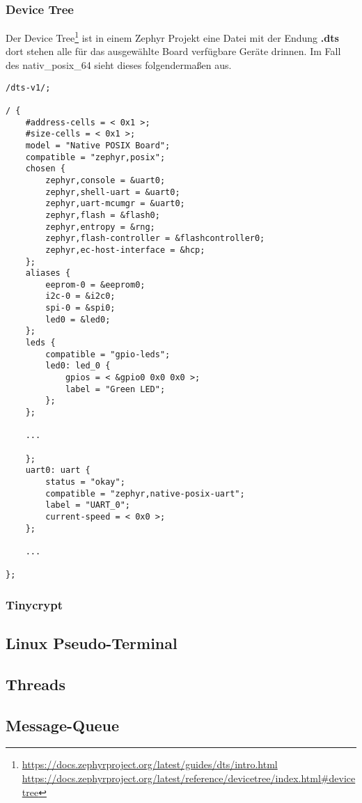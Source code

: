     \subsubsection{Device Tree}
    Der Device Tree\footnote{\url{https://docs.zephyrproject.org/latest/guides/dts/intro.html}\\\url{https://docs.zephyrproject.org/latest/reference/devicetree/index.html\#devicetree}} ist 
    in einem Zephyr Projekt eine Datei mit der Endung \textbf{.dts} dort stehen alle für das ausgewählte Board verfügbare Geräte drinnen.
    Im Fall des nativ\_posix\_64 sieht dieses folgendermaßen aus. 
    \begin{lstlisting}[style=StyleC, captionpos=b, caption=West Beispiel, label=West Beispiel]
/dts-v1/;

/ {
    #address-cells = < 0x1 >;
    #size-cells = < 0x1 >;
    model = "Native POSIX Board";
    compatible = "zephyr,posix";
    chosen {
        zephyr,console = &uart0;
        zephyr,shell-uart = &uart0;
        zephyr,uart-mcumgr = &uart0;
        zephyr,flash = &flash0;
        zephyr,entropy = &rng;
        zephyr,flash-controller = &flashcontroller0;
        zephyr,ec-host-interface = &hcp;
    };
    aliases {
        eeprom-0 = &eeprom0;
        i2c-0 = &i2c0;
        spi-0 = &spi0;
        led0 = &led0;
    };
    leds {
        compatible = "gpio-leds";
        led0: led_0 {
            gpios = < &gpio0 0x0 0x0 >;
            label = "Green LED";
        };
    };

    ...

    };
    uart0: uart {
        status = "okay";
        compatible = "zephyr,native-posix-uart";
        label = "UART_0";
        current-speed = < 0x0 >;
    };
    
    ...

};    
    \end{lstlisting}


\newpage
    \subsubsection{Tinycrypt}
\subsection{Linux Pseudo-Terminal}
\subsection{Threads}
\subsection{Message-Queue}
